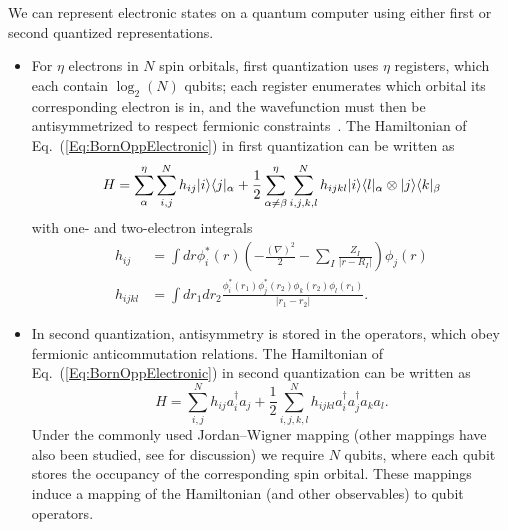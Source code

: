 \begin{refsection}
We can represent electronic states on a quantum computer using either first or second quantized representations.
\begin{itemize}
    \item For $\eta$ electrons in $N$ spin orbitals, first quantization uses $\eta$ registers, which each contain $\log_2(N)$ qubits; each register enumerates which orbital its corresponding electron is in, and the wavefunction must then be antisymmetrized to respect fermionic constraints~\cite{berry2018ImprovedEigenstatesFermionic}. The Hamiltonian of Eq.~(\ref{Eq:BornOppElectronic}) in first quantization can be written as
    \begin{equation}
        H = \sum_\alpha^\eta \sum_{i,j}^N h_{ij} \lvert i\rangle\langle j\rvert_\alpha + \frac{1}{2} \sum_{\alpha \neq \beta}^\eta \sum_{i,j,k,l}^N h_{ijkl} \lvert i\rangle\langle l\rvert_\alpha \otimes \lvert j\rangle\langle k\rvert_\beta
    \end{equation}
    with one- and two-electron integrals
    \begin{align}
        h_{ij} &= \int dr \phi_i^*(r) \left(-\frac{(\nabla)^2}{2} - \sum_I \frac{Z_I}{|r - R_I|}  \right) \phi_j(r) \\
        h_{ijkl} &= \int dr_1 dr_2 \frac{\phi_i^*(r_1) \phi_j^*(r_2) \phi_k(r_2) \phi_l(r_1)}{|r_1 - r_2|}.
    \end{align}
    \item In second quantization, antisymmetry is stored in the operators, which obey fermionic anticommutation relations. The Hamiltonian of Eq.~(\ref{Eq:BornOppElectronic}) in second quantization can be written as
    \begin{equation}
    H = \sum_{i,j}^N h_{ij} a_i^\dag a_j + \frac{1}{2}  \sum_{i,j,k,l}^N h_{ijkl} a_i^\dag a_j^\dag a_k a_l.
    \end{equation}
    Under the commonly used Jordan--Wigner mapping (other mappings have also been studied, see \cite{mcArdle2017QuantCompuChem} for discussion) we require $N$ qubits, where each qubit stores the occupancy of the corresponding spin orbital. These mappings induce a mapping of the Hamiltonian (and other observables) to qubit operators.
\end{itemize}




\end{refsection}
